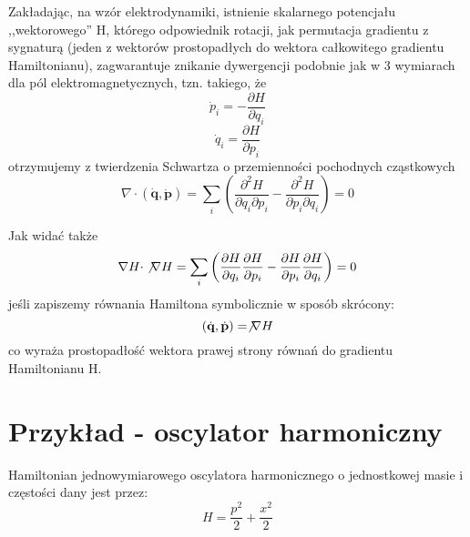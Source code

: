 \documentclass{article}
\begin{document}
Zakładając, na wzór elektrodynamiki, istnienie skalarnego potencjału ,,wektorowego'' H, którego odpowiednik rotacji, jak permutacja gradientu z sygnaturą (jeden z wektorów prostopadłych do wektora całkowitego gradientu Hamiltonianu), zagwarantuje znikanie dywergencji podobnie jak w 3 wymiarach dla pól elektromagnetycznych, tzn. takiego, że 
$$ {\dot {p}}_{i}=-{\frac {\partial H}{\partial q_{i}}} $$
$$ {\dot {q}}_{i}={\frac {\partial H}{\partial p_{i}}} $$
otrzymujemy z twierdzenia Schwartza o przemienności pochodnych cząstkowych
\[ \nabla \cdot ({\dot {\mathbf {q} }},{\dot {\mathbf {p} }})=\sum _{i}\left({\frac {\partial ^{2}H}{\partial q_{i}\partial p_{i}}}-{\frac {\partial ^{2}H}{\partial p_{i}\partial q_{i}}}\right)=0 \]

Jak widać także
\[ \nabla H\cdot \not \nabla H=\sum _{i}\left({\frac {\partial H}{\partial q_{i}}}{\frac {\partial H}{\partial p_{i}}}-{\frac {\partial H}{\partial p_{i}}}{\frac {\partial H}{\partial q_{i}}}\right)=0 \]
jeśli zapiszemy równania Hamiltona symbolicznie w sposób skrócony: 
$$ ({\dot {\mathbf {q} }},{\dot {\mathbf {p} }})=\not \nabla H $$
co wyraża prostopadłość wektora prawej strony równań do gradientu Hamiltonianu H. 

\section*{Przykład - oscylator harmoniczny}
Hamiltonian jednowymiarowego oscylatora harmonicznego o jednostkowej masie i częstości dany jest przez: 
\begin{displaymath}
H={\frac {p^{2}}{2}}+{\frac {x^{2}}{2}}
\end{displaymath}
\end{document}
